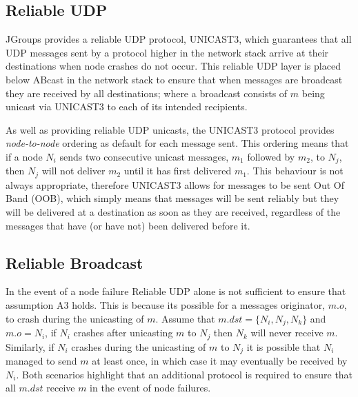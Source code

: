 	\subsection{Reliable UDP}\label{ssec:reliable_udp}
	JGroups provides a reliable UDP protocol, \textsf{UNICAST3}, which guarantees that all UDP messages sent by a protocol higher in the network stack arrive at their destinations when node crashes do not occur.  This reliable UDP layer is placed below \textsf{ABcast} in the network stack to ensure that when messages are broadcast they are received by all destinations; where a broadcast consists of $m$ being unicast via \textsf{UNICAST3} to each of its intended recipients.  
	
	As well as providing reliable UDP unicasts, the \textsf{UNICAST3} protocol provides \emph{node-to-node} ordering as default for each message sent.  This ordering means that if a node $N_i$ sends two consecutive unicast messages, $m_1$ followed by $m_2$, to $N_j$, then $N_j$ will not deliver $m_2$ until it has first delivered $m_1$.  This behaviour is not always appropriate, therefore \textsf{UNICAST3} allows for messages to be sent Out Of Band (OOB), which simply means that messages will be sent reliably but they will be delivered at a destination as soon as they are received, regardless of the messages that have (or have not) been delivered before it.  
	
	\subsection{Reliable Broadcast}\label{ssec:rbcast}
    In the event of a node failure Reliable UDP alone is not sufficient to ensure that assumption A3 holds.  This is because its possible for a messages originator, $m.o$, to crash during the unicasting of $m$.  Assume that $m.dst = \{N_i, N_j, N_k\}$ and $m.o = N_i$, if $N_i$ crashes after unicasting $m$ to $N_j$ then $N_k$ will never receive $m$.  Similarly, if $N_i$ crashes during the unicasting of $m$ to $N_j$ it is possible that $N_i$ managed to send $m$ at least once, in which case it may eventually be received by $N_i$.  Both scenarios highlight that an additional protocol is required to ensure that all $m.dst$ receive $m$ in the event of node failures.  
    
